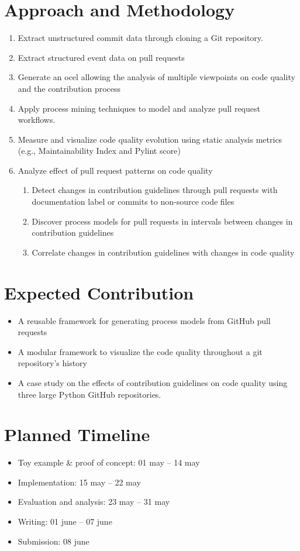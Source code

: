 \section*{Approach and Methodology}
\begin{enumerate}[noitemsep]
    \item Extract unstructured commit data through cloning a Git repository.
    \item Extract structured event data on pull requests
    \item Generate an \ac{ocel} allowing the analysis of multiple viewpoints on code quality and the contribution process
    \item Apply process mining techniques to model and analyze pull request workflows.
    \item Measure and visualize code quality evolution using static analysis metrics (e.g., Maintainability Index and Pylint score)
    \item Analyze effect of pull request patterns on code quality
    \begin{enumerate}
    		\item Detect changes in contribution guidelines through pull requests with documentation label or commits to non-source code files
    		\item Discover process models for pull requests in intervals between changes in contribution guidelines
    		\item Correlate changes in contribution guidelines with changes in code quality
    \end{enumerate}
\end{enumerate}

\section*{Expected Contribution}
\begin{itemize}[noitemsep]
    \item A reusable framework for generating process models from GitHub pull requests
    \item A modular framework to visualize the code quality throughout a git repository's history
    \item A case study on the effects of contribution guidelines on code quality using three large Python GitHub repositories.
\end{itemize}

\section*{Planned Timeline}
\begin{itemize}[noitemsep]
    \item Toy example \& proof of concept: 01 may -- 14 may
    \item Implementation: 15 may -- 22 may
    \item Evaluation and analysis: 23 may -- 31 may
    \item Writing: 01 june -- 07 june
    \item Submission: 08 june
\end{itemize}